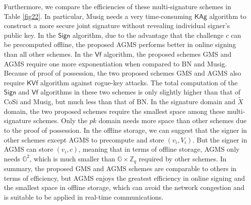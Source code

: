 \documentclass[journal]{IEEEtran}
\begin{document}
Furthermore, we compare the efficiencies of these multi-signature schemes in Table \ref{fig22}.
In particular, Musig needs a very time-consuming \(\textsf{KAg}\) algorithm to construct a more secure joint signature without revealing individual signer's public key.
In the \(\textsf{Sign}\) algorithm, due to the advantage that the challenge \(c\) can be precomputed offline, the proposed AGMS performs better in online signing than all other schemes.
In the \(\textsf{Vf}\) algorithm, the proposed schemes GMS and AGMS require one more exponentiation when compared to BN and Musig.
Because of proof of possession, the two proposed schemes GMS and AGMS also require \(\textsf{KVf}\) algorithm against rogue-key attacks.
The total computation of the \(\textsf{Sign}\) and \(\textsf{Vf}\) algorithms in these two schemes is only slightly higher than that of CoSi and Musig, but much less than that of BN.
In the signature domain and \(\tilde{X}\) domain, the two proposed schemes require the smallest space among these multi-signature schemes. Only the \(pk\) domain needs more space than other schemes due to the proof of possession. In the offline storage, we can suggest that the signer in other schemes except AGMS to precompute and store \((v_i,V_i)\). But the signer in AGMS can store \((v_i,c)\), meaning that in terms of offline storage, AGMS only needs \(\mathbb{G}^2\), which is much smaller than \(\mathbb{G}\times \mathbb{Z}_q\) required by other schemes.
In summary, the proposed GMS and AGMS schemes are comparable to others in terms of efficiency, but AGMS enjoys the greatest efficiency in online signing and the smallest space in offline storage, which can avoid the network congestion and is suitable to be applied in real-time communications.
\end{document}
